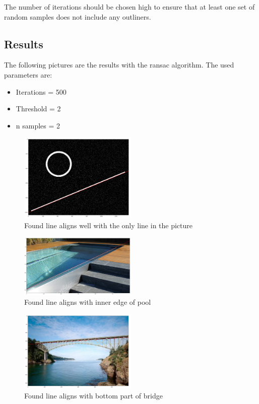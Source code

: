 \documentclass[12pt]{article}
\begin{document}
The number of iterations should be chosen high to ensure that at least one set of random samples does not include any outliners.

\pagebreak
\subsection{Results}
The following pictures are the results with the ransac algorithm. The used parameters are:
\begin{itemize}
    \item Iterations = 500
    \item Threshold = 2
    \item n samples = 2
    \end{itemize}

\begin{figure}[!htb]
    \centering
    \includegraphics[width=0.5\textwidth]{pics/synthetic}
    \caption{Found line aligns well with the only line in the picture}
    \end{figure}

    \begin{figure}[!htb]
        \centering
        \includegraphics[width=0.5\textwidth]{pics/pool}
        \caption{Found line aligns with inner edge of pool}
        \end{figure}

\pagebreak

\begin{figure}[!htb]
    \centering
    \includegraphics[width=0.5\textwidth]{pics/bridge}
    \caption{Found line aligns with bottom part of bridge}
    \end{figure}
\end{document}
